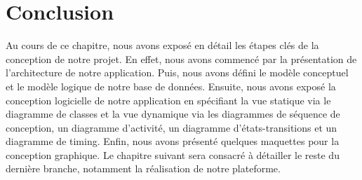 \section*{Conclusion}
Au cours de ce chapitre, nous avons exposé en détail les étapes clés de la conception de notre projet. En effet, nous avons commencé par la présentation de l’architecture de notre application. Puis, nous avons défini le modèle conceptuel et le modèle logique de notre base de données. Ensuite, nous avons exposé la conception logicielle de notre application en spécifiant la vue statique via le diagramme de classes et la vue dynamique via les diagrammes de séquence de conception, un diagramme d’activité, un diagramme d’états-transitions et un diagramme de timing. Enfin, nous avons présenté quelques maquettes pour la conception graphique. Le chapitre suivant sera consacré à détailler le reste du dernière branche, notamment la réalisation de notre plateforme.



